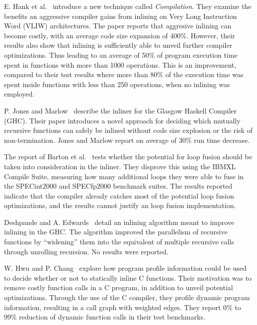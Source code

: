 E. Hank et al.~\cite{RegionBasedCompilationIntroduction} introduce a new
technique called \textit{ Compilation}. They examine the benefits an
aggressive compiler gains from inlining on Very Long Instruction Word (VLIW)
architectures. The paper reports that aggresive inlining can become costly, with
an average code size expansion of 400\%. However, their results also show that
inlining is sufficiently able to unveil further compiler optimizations. Thus
leading to an average of 50\% of program execution time spent in functions with
more than 1000 operations. This is an improvement, compared to their test
results where more than 80\% of the execution time was spent inside functions
with less than 250 operations, when no inlining was employed.

P. Jones and Marlow~\cite{GHCPaper} describe the inliner for the Glasgow Haskell
Compiler (GHC). Their paper introduces a novel approach for deciding which
mutually recursive functions can safely be inlined without code size explosion
or the risk of non-termination. Jones and Marlow report on average of 30\% run
time decrease.

The report of Barton et al.~\cite{ShouldLoopOptsInfluenceInlining} tests whether
the potential for loop fusion should be taken into consideration in the inliner.
They disprove this using the IBM\textregistered XL Compile Suite, measuring how
many additional loops they were able to fuse in the SPECint2000 and SPECfp2000
benchmark suites. The results reported indicate that the compiler already
catches most of the potential loop fusion optimizations, and the results cannot
justify an  loop fusion implementation.

Deshpande and A. Edwards~\cite{deshpande2012statically} detail an inlining
algorithm meant to improve inlining in the GHC. The algorithm improved the
parallelism of recursive functions by ``widening'' them into the equivalent of
multiple recursive calls through unrolling recursion. No results were reported.

W. Hwu and P. Chang~\cite{InlineFuncExpCProgs} explore how program profile
information could be used to decide whether or not to statically inline C
functions. Their motivation was to remove costly function calls in a C program,
in addition to unveil potential optimizations. Through the use of the  C
compiler, they profile dynamic program information, resulting in a call graph
with weighted edges. They report 0\% to 99\% reduction of dynamic function calls
in their test benchmarks.
